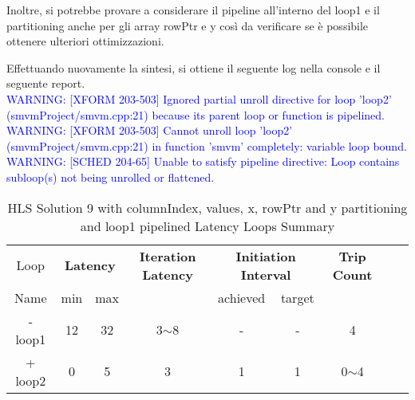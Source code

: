 Inoltre, si potrebbe provare a considerare il pipeline all'interno del loop1 e il partitioning anche per gli array rowPtr e y così da verificare se è possibile ottenere ulteriori ottimizzazioni.



Effettuando nuovamente la sintesi, si ottiene il seguente log nella console e il seguente report.
\\
\textcolor{blue}{WARNING: [XFORM 203-503] Ignored partial unroll directive for loop 'loop2' (smvmProject/smvm.cpp:21) because its parent loop or function is pipelined.}
\\
\textcolor{blue}{WARNING: [XFORM 203-503] Cannot unroll loop 'loop2' (smvmProject/smvm.cpp:21) in function 'smvm' completely: variable loop bound.}
\\
\textcolor{blue}{WARNING: [SCHED 204-65] Unable to satisfy pipeline directive: Loop contains subloop(s) not being unrolled or flattened.}
\\
\begin{table}[H]
	\centering
	\begin{tabular}{|c|c|c|c|c|c|c|c|c|}
		\hline
		\multicolumn{1}{|c|}{Loop} & \multicolumn{2}{|c|}{\textbf{Latency}} & \multicolumn{1}{c|}{\textbf{Iteration Latency}} & \multicolumn{2}{c|}{\textbf{Initiation Interval}} & \multicolumn{1}{c|}{\textbf{Trip Count}}  \\
		Name & min & max &  & achieved & target &  \\
		\hline
		- loop1 & 12 & 32 & 3$\sim$8 & - & - & 4 \\
		+ loop2 & 0 & 5 & 3 & 1 & 1 & 0$\sim$4 \\
		\hline
	\end{tabular}
	\caption{HLS Solution 9 with columnIndex, values, x, rowPtr and y partitioning and loop1 pipelined Latency Loops Summary}
	\label{tab:hls-solution-9-columnindex-values-partitioning-loop-summary}
\end{table}

